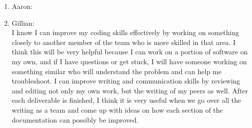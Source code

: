 \documentclass[12pt]{article}
\begin{document}
\begin{enumerate}
\begin{enumerate}
    \item{Aaron:}\\
    \item {Gillian:}\\
    I know I can improve my coding skills effectively by working on something closely to another member of the team who is more skilled in that area. I think this will be very helpful because I can work on a portion of software on my own, and if I have questions or get stuck, I will have someone working on something similar who will understand the problem and can help me troubleshoot. 
    \noindent I can improve writing and communication skills by reviewing and editing not only my own work, but the writing of my peers as well. After each deliverable is finished, I think it is very useful when we go over all the writing as a team and come up with ideas on how each section of the documentation can possibly be improved. 
    
  \end{enumerate}
\end{enumerate}
\end{document}
